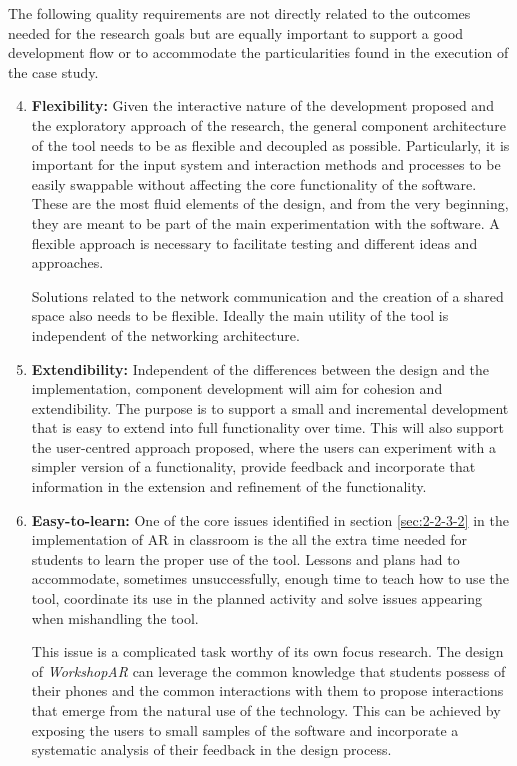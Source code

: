 The following quality requirements are not directly related to the outcomes needed for the research goals but are equally important to support a good development flow or
to accommodate the particularities found in the execution of the case study.

\begin{enumerate}
    \setcounter{enumi}{3}
    \item \textbf{Flexibility:} Given the interactive nature of the development proposed and the exploratory approach of the research, the general component architecture
    of the tool needs to be as flexible and decoupled as possible. Particularly, it is important for the input system and interaction methods and processes to be easily
    swappable without affecting the core functionality of the software. These are the most fluid elements of the design, and from the very beginning, they are meant to be
    part of the main experimentation with the software. A flexible approach is necessary to facilitate testing and different ideas and approaches.

    Solutions related to the network communication and the creation of a shared space also needs to be flexible. Ideally the main utility of the tool is independent of the
    networking architecture.
    \item \textbf{Extendibility:} Independent of the differences between the design and the implementation, component development will aim for cohesion and extendibility.
    The purpose is to support a small and incremental development that is easy to extend into full functionality over time. This will also support the user-centred
    approach proposed, where the users can experiment with a simpler version of a functionality, provide feedback and incorporate that information in the extension and
    refinement of the functionality.
    \item \textbf{Easy-to-learn:} One of the core issues identified in section \ref{sec:2-2-3-2} in the implementation of \ac{AR} in classroom is the all the extra time
    needed for students to learn the proper use of the tool. Lessons and plans had to accommodate, sometimes unsuccessfully, enough time to teach how to use the tool,
    coordinate its use in the planned activity and solve issues appearing when mishandling the tool.

    This issue is a complicated task worthy of its own focus research. The design of \emph{WorkshopAR} can leverage the common knowledge that students possess of their
    phones and the common interactions with them to propose interactions that emerge from the natural use of the technology. This can be achieved by exposing the users
    to small samples of the software and incorporate a systematic analysis of their feedback in the design process.
\end{enumerate}

